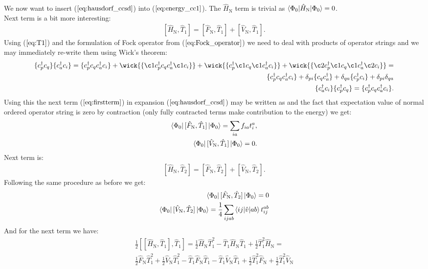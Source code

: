 \documentclass[twoside,english]{uiofysmaster}
\theoremstyle{definition}
\begin{document}
We now want to insert ($\ref{eq:hausdorf_ccsd}$) into ($\ref{eq:energy_cc1}$). The $\hat{H}_\text{N}$ term is trivial as $\braket{\Phi_0|\hat{H}_\text{N}|\Phi_0}=0$.\\
Next term is a bit more interesting:
\begin{eqnarray}\label{eq:firstterm}
 [\hat{H}_\text{N},\hat{T}_1] =  [\hat{F}_\text{N},\hat{T}_1] +  [\hat{V}_\text{N},\hat{T}_1].
\end{eqnarray}
Using ($\ref{eq:T1}$) and the formulation of Fock operator from ($\ref{eq:Fock_operator}$) we need to deal with products of operator strings and we may immediately re-write them using Wick's theorem:
\begin{eqnarray}
\{c_p^\dagger c_q \}\{c_a^\dagger c_i \} =\{c_p^\dagger c_q c_a^\dagger c_i \} + \wick{ \{\c1 c_p^\dagger c_q c_a^\dagger \c1 c_i \} } + \wick{ \{ c_p^\dagger \c1 c_q \c1 c_a^\dagger  c_i \} } +
 \wick{ \{ \c2 c_p^\dagger \c1 c_q \c1 c_a^\dagger \c2  c_i \} } = \nonumber\\
 \{c_p^\dagger c_q c_a^\dagger c_i \} + \delta_{pi} \{ c_q c_a^\dagger\} +\delta_{qa} \{  c_p^\dagger c_i \} +  \delta_{pi}\delta_{qa}\\
 \{c_a^\dagger c_i \}\{c_p^\dagger c_q \}= \{c_p^\dagger c_q c_a^\dagger c_i \}.
\end{eqnarray}
Using this the next term ($\ref{eq:firstterm}$) in expansion ($\ref{eq:hausdorf_ccsd}$) may be written as and the fact that expectation value of normal ordered operator string is zero by contraction (only fully contracted terms make contribution to the energy) we get:
\begin{eqnarray}
\bra{\Phi_0}[\hat{F}_\text{N},\hat{T}_1] \ket{\Phi_0}=\sum_{ia} f_{ia}t_i^a,\\
\bra{\Phi_0}[\hat{V}_\text{N},\hat{T}_1] \ket{\Phi_0}=0.
\end{eqnarray}
Next term is:
\begin{eqnarray}\label{eq:secondterm}
[\hat{H}_\text{N},\hat{T}_2]=[\hat{F}_\text{N},\hat{T}_2] +  [\hat{V}_\text{N},\hat{T}_2].
\end{eqnarray} 
Following the same procedure as before we get:
\begin{eqnarray}
\bra{\Phi_0}[\hat{F}_\text{N},\hat{T}_2] \ket{\Phi_0}=0\\
\bra{\Phi_0}[\hat{V}_\text{N},\hat{T}_2] \ket{\Phi_0}=\frac{1}{4}\sum_{ijab}\braket{ij|\hat{v}|ab}t_{ij}^{ab}
\end{eqnarray}
And for the next term we have:
\begin{eqnarray}
\frac{1}{2}[[\hat{H}_\text{N},\hat{T}_1],\hat{T}_1]= \frac{1}{2}\hat{H}_\text{N}\hat{T}_1^2 -\hat{T}_1\hat{H}_\text{N}\hat{T}_1 + \frac{1}{2}\hat{T}_1^2\hat{H}_\text{N}=\nonumber \\
 \frac{1}{2}\hat{F}_\text{N}\hat{T}_1^2 +  \frac{1}{2}\hat{V}_\text{N}\hat{T}_1^2 
 -\hat{T}_1\hat{F}_\text{N}\hat{T}_1  -\hat{T}_1\hat{V}_\text{N}\hat{T}_1 + 
 \frac{1}{2}\hat{T}_1^2\hat{F}_\text{N} +  \frac{1}{2}\hat{T}_1^2\hat{V}_\text{N}
\end{eqnarray}
\end{document}

